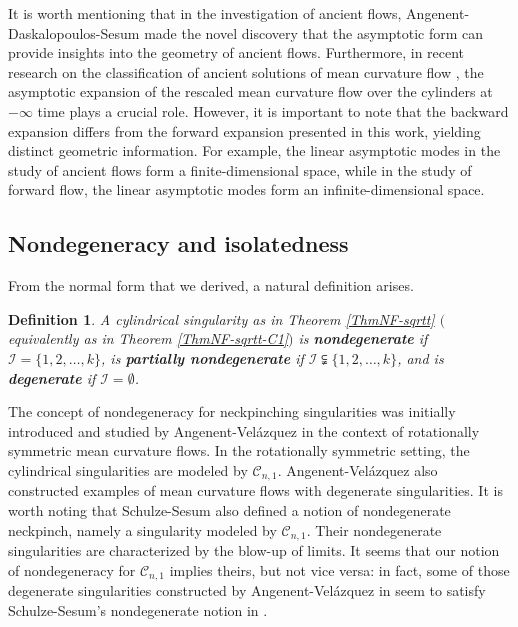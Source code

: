 \documentclass[11pt]{amsart}
\numberwithin{equation}{section}
\newtheorem{definition}[theorem]{Definition}
\numberwithin{equation}{section}
\newcommand{\cC}{\mathcal{C}}
\newcommand{\cI}{\mathcal{I}}
\begin{document}
	
	It is worth mentioning that in the investigation of ancient flows, Angenent-Daskalopoulos-Sesum \cite{ADS1} made the novel discovery that the asymptotic form can provide insights into the geometry of ancient flows. Furthermore, in recent research on the classification of ancient solutions of mean curvature flow \cite{ADS1, ADS2, BC1, BC2, CHH, CHHW, DuZhu22_spectral}, the asymptotic expansion of the rescaled mean curvature flow over the cylinders at $-\infty$ time plays a crucial role. However, it is important to note that the backward expansion differs from the forward expansion presented in this work, yielding distinct geometric information. For example, the linear asymptotic modes in the study of ancient flows form a finite-dimensional space, while in the study of forward flow, the linear asymptotic modes form an infinite-dimensional space.
	
	\subsection{Nondegeneracy and isolatedness}
	From the normal form that we derived, a natural definition arises.
	
	\begin{definition}\label{DefDeg}
		A cylindrical singularity as in Theorem \ref{ThmNF-sqrtt} $($equivalently as in Theorem \ref{ThmNF-sqrtt-C1}$)$ is \textbf{nondegenerate} if $\mathcal I=\{1,2,\ldots,k\}$, is {\bf partially nondegenerate} if $\mathcal I\subsetneqq\{1,2,\ldots,k\}$, and is \textbf{degenerate}  if $\cI=\emptyset$.   
	\end{definition}
	
	The concept of nondegeneracy for neckpinching singularities was initially introduced and studied by Angenent-Vel\'azquez \cite{AV} in the context of rotationally symmetric mean curvature flows. In the rotationally symmetric setting, the cylindrical singularities are modeled by $\cC_{n,1}$. Angenent-Vel\'azquez also constructed examples of mean curvature flows with degenerate singularities. It is worth noting that Schulze-Sesum \cite{SS} also defined a notion of nondegenerate neckpinch, namely a singularity modeled by $\cC_{n,1}$. Their nondegenerate singularities are characterized by the blow-up of limits. It seems that our notion of nondegeneracy for $\cC_{n,1}$ implies theirs, but not vice versa: in fact, some of those degenerate singularities constructed by Angenent-Vel\'azquez in \cite{AV} seem to satisfy Schulze-Sesum's nondegenerate notion in \cite{SS}.
	
\end{document}

